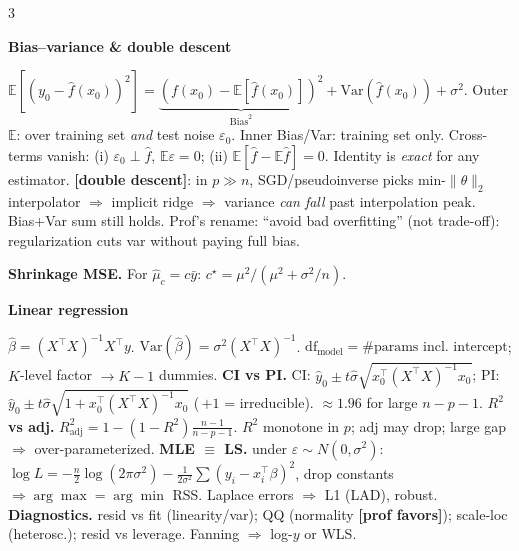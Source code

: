 \documentclass[a4paper,8pt]{extarticle}
\renewcommand{\section}[1]{\par\vspace{2pt}\noindent\colorbox{black!15}{\parbox{0.97\linewidth}{\strut\bfseries\small #1}}\par\vspace{1pt}}
\newcommand{\hd}[1]{\textbf{#1.}}
\newcommand{\tr}[1]{\textcolor{red!70!black}{\textbf{[#1]}}} %
\newcommand{\df}{\mathrm{df}}
\newcommand{\E}{\mathbb{E}}
\newcommand{\Var}{\mathrm{Var}}
\begin{document}
\begin{multicols*}{3}
\scriptsize

\section*{TMA4268 Cheat Sheet}

\section{Bias--variance \& double descent}
$\E[(y_0-\hat f(x_0))^2] = \underbrace{(f(x_0)-\E[\hat f(x_0)])^2}_{\text{Bias}^2} + \Var(\hat f(x_0)) + \sigma^2$.
Outer $\E$: over training set \emph{and} test noise $\varepsilon_0$. Inner Bias/Var: training set only.
Cross-terms vanish: (i) $\varepsilon_0\!\perp\!\hat f$, $\E\varepsilon=0$; (ii) $\E[\hat f-\E\hat f]=0$.
Identity is \emph{exact} for any estimator. \tr{double descent}: in $p\!\gg\! n$, SGD/pseudoinverse picks min-$\|\theta\|_2$ interpolator $\Rightarrow$ implicit ridge $\Rightarrow$ variance \emph{can fall} past interpolation peak. Bias+Var sum still holds.
Prof's rename: ``avoid bad overfitting'' (not trade-off): regularization cuts var without paying full bias.

\hd{Shrinkage MSE} For $\hat\mu_c=c\bar y$: $c^\star = \mu^2/(\mu^2+\sigma^2/n)$.

\section{Linear regression}
$\hat\beta=(X^\top X)^{-1}X^\top y$. $\Var(\hat\beta)=\sigma^2(X^\top X)^{-1}$.
$\df_{\text{model}}=\#\text{params incl.\ intercept}$; $K$-level factor $\to K-1$ dummies.
\hd{CI vs PI} CI: $\hat y_0\pm t\hat\sigma\sqrt{x_0^\top(X^\top X)^{-1}x_0}$; PI: $\hat y_0\pm t\hat\sigma\sqrt{1+x_0^\top(X^\top X)^{-1}x_0}$ (\,$+1$ = irreducible). $\approx 1.96$ for large $n-p-1$.
\hd{$R^2$ vs adj} $R^2_{\text{adj}}=1-(1-R^2)\tfrac{n-1}{n-p-1}$. $R^2$ monotone in $p$; adj may drop; large gap $\Rightarrow$ over-parameterized.
\hd{MLE $\equiv$ LS} under $\varepsilon\sim N(0,\sigma^2)$:
$\log L = -\tfrac{n}{2}\log(2\pi\sigma^2) - \tfrac{1}{2\sigma^2}\sum(y_i-x_i^\top\beta)^2$, drop constants $\Rightarrow \arg\max=\arg\min$ RSS. Laplace errors $\Rightarrow$ L1 (LAD), robust.
\hd{Diagnostics} resid vs fit (linearity/var); QQ (normality \tr{prof favors}); scale-loc (heterosc.); resid vs leverage. Fanning $\Rightarrow$ log-$y$ or WLS.


\end{multicols*}
\end{document}
